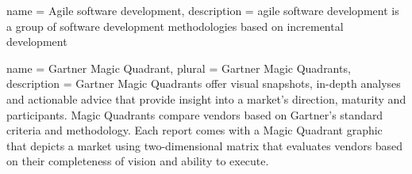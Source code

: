 {
	name = {Agile software development},
	description = {agile software development is a group of software development methodologies based on
		incremental development}
}

{
	name = {Gartner Magic Quadrant},
	plural = {Gartner Magic Quadrants},
	description = {Gartner Magic Quadrants offer visual snapshots, in-depth analyses and actionable advice
		that provide insight into a market’s direction, maturity and participants. Magic Quadrants compare
		vendors based on Gartner’s standard criteria and methodology. Each report comes with a Magic Quadrant
		graphic that depicts a market using two-dimensional matrix that evaluates vendors based on their
		completeness of vision and ability to execute.}
}